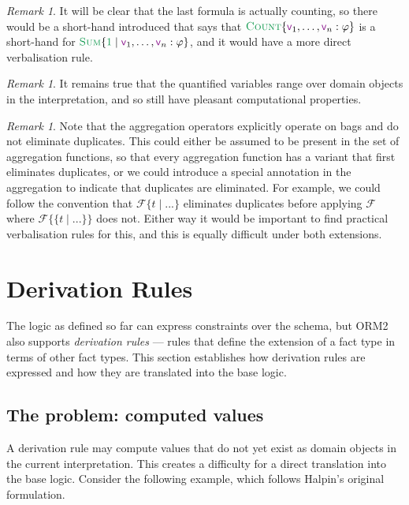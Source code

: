 \documentclass[11pt]{amsart}
\theoremstyle{definition}
\theoremstyle{remark}
\newtheorem{remark}[theorem]{Remark}
\newcommand{\var}[1]{\mathsf{\textcolor{Plum}{#1}}}
\newcommand{\dataFun}[1]{\textcolor{ForestGreen}{\textsc{#1}}}
\newcommand{\dataVal}[1]{\textcolor{ForestGreen}{#1}}
\begin{document}
\begin{remark}
It will be clear that the last formula is actually counting, so there would be a short-hand introduced that says that $\dataFun{Count}\{ \var{v}_1, \ldots, \var{v}_n : \varphi \}$ is a short-hand for $\dataFun{Sum}\{ \dataVal{1} \mid  \var{v}_1, \ldots, \var{v}_n : \varphi \}$, and it would have a more direct verbalisation rule.
\end{remark}

\begin{remark}
It remains true that the quantified variables range over domain objects in the interpretation, and so still have pleasant computational properties. 
\end{remark}

\begin{remark}
Note that the aggregation operators explicitly operate on bags and do not eliminate duplicates. This could either be assumed to be present in the set of aggregation functions, so that every aggregation function has a variant that first eliminates duplicates, or we could introduce a special annotation in the aggregation to indicate that duplicates are eliminated. For example, we could follow the convention that  $\mathcal{F}\{ t \mid ... \}$ eliminates duplicates before applying $\mathcal{F}$ where $\mathcal{F}\{\!\{ t \mid ... \}\!\}$ does not. Either way it would be important to find practical verbalisation rules for this, and this is equally difficult under both extensions.
\end{remark}


\section{Derivation Rules}
\label{sec:derivation}

The logic as defined so far can express constraints over the schema, but
ORM2 also supports \emph{derivation rules} — rules that define the
extension of a fact type in terms of other fact types. This section
establishes how derivation rules are expressed and how they are translated
into the base logic.

\subsection*{The problem: computed values}

A derivation rule may compute values that do not yet exist as domain
objects in the current interpretation. This creates a difficulty for a
direct translation into the base logic. Consider the following example,
which follows Halpin's original formulation.
\end{document}
